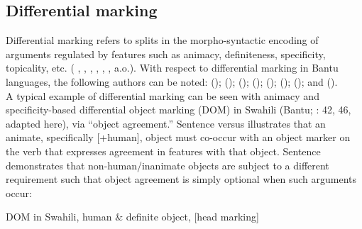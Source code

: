 \documentclass[output=paper]{langscibook}
\begin{document}
\subsection{Differential marking}\label{sec:schneider:subsection1.1Differentialmarking}

Differential marking refers to splits in the morpho-syntactic encoding of arguments regulated by features such as animacy, definiteness, specificity, topicality, etc. (\citeauthor{Silverstein1976} \citeyear{Silverstein1976}, \citeauthor{boss98} \citeyear{boss98}, \citeauthor{laz01} \citeyear{laz01}, \citeauthor{Aissen2003} \citeyear{Aissen2003}, \citeauthor{Lopez2012} \citeyear{Lopez2012}, \citeauthor{OrmazabalRomero2013} \citeyear{OrmazabalRomero2013}, a.o.). With respect to differential marking in Bantu languages, the following authors can be noted: \citeauthor{Bentley1994} (\citeyear{Bentley1994}); \citeauthor{Duranti1979} (\citeyear{Duranti1979}); \citeauthor{HawkinsonHyman1974} (\citeyear{HawkinsonHyman1974}); \citeauthor{MorolongHyman1977} (\citeyear{MorolongHyman1977}); \citeauthor{MorolongHyman1977} (\citeyear{MorolongHyman1977}); \citeauthor{Mursell2018} (\citeyear{Mursell2018}); \citeauthor{SeidlDimitriadis1997} (\citeyear{SeidlDimitriadis1997}); and \citeauthor{vanderWal2015} (\citeyear{vanderWal2015}). \\
\indent A typical example of differential marking can be seen with animacy and spec\-i\-fic\-i\-ty-based differential object marking (DOM) in Swahili (Bantu; \citeauthor{Riedel2009} \citeyear{Riedel2009}: 42, 46, adapted here), via ``object agreement.'' Sentence  versus  illustrates that an animate, specifically [+human], object must co-occur with an object marker on the verb that expresses agreement in features with that object. Sentence  demonstrates that non-human/inanimate objects are subject to a different requirement such that object agreement is simply optional when such arguments occur:\largerpage[-1]\pagebreak

\ea \label{ex:swahili}
DOM in Swahili, human $\&$ definite object, [head marking]
\begin{xlist}
\end{xlist}
\z
\end{document}
